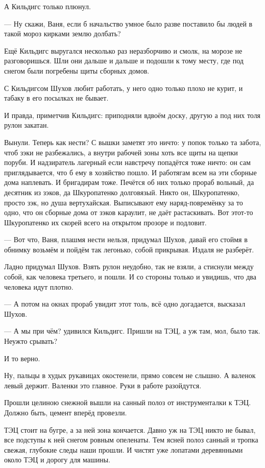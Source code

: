 А Кильдигс только плюнул.

--- Ну скажи, Ваня, если б начальство умное было \dash разве поставило бы людей в такой мороз
кирками землю долбать?

Ещё Кильдигс выругался несколько раз неразборчиво и смолк, на морозе не разговоришься. Шли
они дальше и дальше и подошли к тому месту, где под снегом были погребены щиты сборных домов.

С Кильдигсом Шухов любит работать, у него одно только плохо \dash не курит, и табаку в его
посылках не бывает.

И правда, приметчив Кильдигс: приподняли вдвоём доску, другую \dash а под них толя рулон закатан.

Вынули. Теперь \dash как нести? С вышки заметят \dash это ничто: у попок только та забота, чтоб зэки
не разбежались, а внутри рабочей зоны хоть все щиты на щепки поруби. И надзиратель лагерный
если навстречу попадётся \dash тоже ничто: он сам приглядывается, что б ему в хозяйство пошло. И
работягам всем на эти сборные дома наплевать. И бригадирам тоже. Печётся об них только
прораб вольный, да десятник из зэков, да Шкуропатенко долговязый. Никто он, Шкуропатенко,
просто зэк, но душа вертухайская. Выписывают ему наряд-повремёнку за то одно, что он сборные
дома от зэков караулит, не даёт растаскивать. Вот этот-то Шкуропатенко их скорей всего на
открытом прозоре и подловит.

--- Вот что, Ваня, плашмя нести нельзя, \dash придумал Шухов, \Dash давай его стоймя в обнимку возьмём
и пойдём так легонько, собой прикрывая. Издаля не разберёт.

Ладно придумал Шухов. Взять рулон неудобно, так не взяли, а стиснули между собой, как
человека третьего, \dash и пошли. И со стороны только и увидишь, что два человека идут плотно.

--- А потом на окнах прораб увидит этот толь, всё одно догадается, \dash высказал Шухов.

--- А мы при чём? \dash удивился Кильдигс. \Dash Пришли на ТЭЦ, а уж там, мол, было так. Неужто срывать?

И то верно.

Ну, пальцы в худых рукавицах окостенели, прямо совсем не слышно. А валенок левый держит.
Валенки \dash это главное. Руки в работе разойдутся.

Прошли целиною снежной \dash вышли на санный полоз от инструменталки к ТЭЦ. Должно быть, цемент
вперёд провезли.

ТЭЦ стоит на бугре, а за ней зона кончается. Давно уж на ТЭЦ никто не бывал, все подступы к ней
снегом ровным опеленаты. Тем ясней полоз санный и тропка свежая, глубокие следы \dash наши
прошли. И чистят уже лопатами деревянными около ТЭЦ и дорогу для машины.


